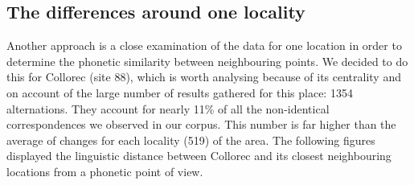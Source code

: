 \documentclass[output=paper]{LSP/langsci}
\begin{document}
\subsection[The differences around one locality]{The differences around one locality}

Another approach is a close examination of the data for one location in order to determine the phonetic similarity between neighbouring points. We decided to do this for Collorec (site 88), which is worth analysing because of its centrality and on account of the large number of results gathered for this place: 1354 alternations. They account for nearly 11\% of all the non-identical correspondences we observed in our corpus. This number is far higher than the average of changes for each locality (519) of the area. The following figures displayed the linguistic distance between Collorec and its closest neighbouring locations from a phonetic point of view.

\begin{table}
\caption{Number of differences to neighbouring sites around Collorec (site 88)}
\label{tab:8}
\end{table}
\end{document}
